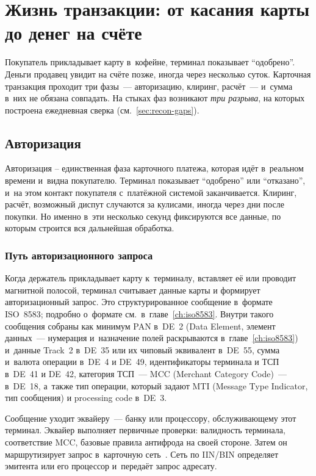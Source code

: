 
\chapter{Жизнь транзакции: от касания карты до денег на счёте}\label{ch:tx-lifecycle}
Покупатель прикладывает карту в~кофейне, терминал показывает
\enquote{одобрено}. Деньги продавец увидит на счёте позже,
иногда через несколько суток. Карточная транзакция проходит
три фазы~--- авторизацию, клиринг, расчёт~--- и~сумма в~них
не обязана совпадать. На стыках фаз возникают \emph{три
разрыва}, на которых построена ежедневная сверка
(см.~\ref{sec:recon-gaps}).

\section{Авторизация}\label{sec:tx-authorization}

Авторизация -- единственная фаза карточного платежа, которая идёт
в~реальном времени и~видна покупателю. Терминал показывает
\enquote{одобрено} или \enquote{отказано}, и~на этом контакт покупателя
с~платёжной системой заканчивается. Клиринг, расчёт, возможный диспут
случаются за кулисами, иногда через дни после покупки. Но именно
в~эти несколько секунд фиксируются все данные, по которым строится
вся дальнейшая обработка.

\subsection*{Путь авторизационного запроса}

Когда держатель прикладывает карту к~терминалу, вставляет её
или проводит магнитной полосой, терминал считывает данные
карты и формирует авторизационный запрос. Это структурированное
сообщение в~формате ISO~8583; подробно о~формате см.\
в~главе~\ref{ch:iso8583}. Внутри такого сообщения собраны как
минимум PAN в~DE~2 (Data Element, элемент данных~--- нумерация
и~назначение полей раскрываются в~главе~\autoref{ch:iso8583})
и~данные Track~2 в~DE~35 или их чиповый
эквивалент в~DE~55, сумма и~валюта операции в~DE~4 и DE~49,
идентификаторы терминала и ТСП в~DE~41 и DE~42, категория
ТСП~--- MCC (Merchant Category Code)~--- в~DE~18, а~также тип
операции, который задают MTI (Message Type Indicator, тип сообщения)
и processing code в~DE~3.

Сообщение уходит эквайеру~--- банку или процессору, обслуживающему
этот терминал. Эквайер выполняет первичные проверки: валидность
терминала, соответствие MCC, базовые правила антифрода на своей
стороне. Затем он маршрутизирует запрос в~карточную сеть~\cite{visa-core-rules}.
Сеть по IIN/BIN определяет эмитента или его процессор
и~передаёт запрос адресату.

